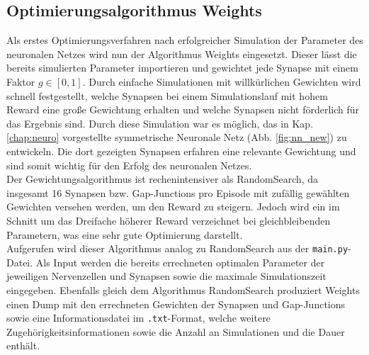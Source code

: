 	\subsection{Optimierungsalgorithmus Weights}
		Als erstes Optimierungsverfahren nach erfolgreicher Simulation der Parameter des neuronalen Netzes wird nun der Algorithmus Weights eingesetzt. Dieser lässt die bereits simulierten Parameter importieren und gewichtet jede Synapse mit einem Faktor $g\in[0,1]$. Durch einfache Simulationen mit willkürlichen Gewichten wird schnell festgestellt, welche Synapsen bei einem Simulationslauf mit hohem Reward eine große Gewichtung erhalten und welche Synapsen nicht förderlich für das Ergebnis sind. Durch diese Simulation war es möglich, das in Kap. \ref{chap:neuro} vorgestellte symmetrische Neuronale Netz (Abb. \ref{fig:nn_new}) zu entwickeln. Die dort gezeigten Synapsen erfahren eine relevante Gewichtung und sind somit wichtig für den Erfolg des neuronalen Netzes.\\
		Der Gewichtungsalgorithmus ist rechenintensiver als RandomSearch, da insgesamt 16 Synapsen bzw. Gap-Junctions pro Episode mit zufällig gewählten Gewichten versehen werden, um den Reward zu steigern. Jedoch wird ein im Schnitt um das Dreifache höherer Reward verzeichnet bei gleichbleibenden Parametern, was eine sehr gute Optimierung darstellt.\\
		Aufgerufen wird dieser Algorithmus analog zu RandomSearch aus der \texttt{main.py}-Datei. Als Input werden die bereits errechneten optimalen Parameter der jeweiligen Nervenzellen und Synapsen sowie die maximale Simulationszeit eingegeben. Ebenfalls gleich dem Algorithmus RandomSearch produziert Weights einen Dump mit den errechneten Gewichten der Synapsen und Gap-Junctions sowie eine Informationsdatei im \texttt{.txt}-Format, welche weitere Zugehörigkeitsinformationen sowie die Anzahl an Simulationen und die Dauer enthält.
		
